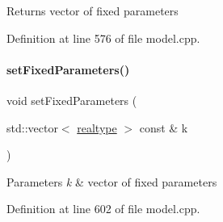 \begin{DoxyReturn}{Returns}
vector of fixed parameters 
\end{DoxyReturn}


Definition at line 576 of file model.\+cpp.

\mbox{\label{classamici_1_1_model_a14ba63ae81b4e8fa1f46884b703e2c30}} 
\paragraph{\texorpdfstring{setFixedParameters()}{setFixedParameters()}}
{\footnotesize\ttfamily void set\+Fixed\+Parameters (\begin{DoxyParamCaption}\item[{std\+::vector$<$ \mbox{\hyperlink{namespaceamici_a1bdce28051d6a53868f7ccbf5f2c14a3}{realtype}} $>$ const \&}]{k }\end{DoxyParamCaption})}


\begin{DoxyParams}{Parameters}
{\em k} & vector of fixed parameters \\
\hline
\end{DoxyParams}


Definition at line 602 of file model.\+cpp.

